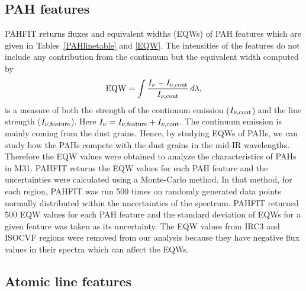\subsection{PAH features}
\label{sect:pah}

PAHFIT returns fluxes and equivalent widths (EQWs) of PAH features which are given in Tables~\ref{PAHlinetable} and \ref{EQW}. The intensities of the features do not include any contribution from the continuum but the equivalent width computed by
\begin{equation}
{\rm EQW}=\int \frac{I_{\nu} - I_{\nu, {\rm cont}}}{I_{\nu, {\rm cont}}} \,d\lambda,
\end{equation}
is a measure of both the strength of the continuum emission ($I_{\nu, {\rm cont}} $) and the line strength ($I_{\nu,{\rm feature}}$). 
Here $I_{\nu} =I_{\nu,{\rm feature}}+ I_{\nu, {\rm cont}} $. 
The continuum emission is mainly coming from the dust grains. Hence, by studying EQWs of PAHs, we can study how the PAHs compete with the dust grains in the mid-IR wavelengths. Therefore the EQW values were obtained to analyze the characteristics of PAHs in M31. PAHFIT returns the EQW values for each PAH feature and the uncertainties were calculated using a Monte-Carlo method. In that method, for each region, PAHFIT was run 500 times on randomly generated data points  normally distributed within the uncertainties of the spectrum. PAHFIT returned 500 EQW values for each PAH feature and the standard deviation of EQWs for a given feature was taken as its uncertainty. 
The EQW values from IRC3 and ISOCVF regions were removed from our analysis because they have negative flux values in their spectra which can affect the EQWs. 


\subsection{Atomic line features}
\label{sect:atomic}

